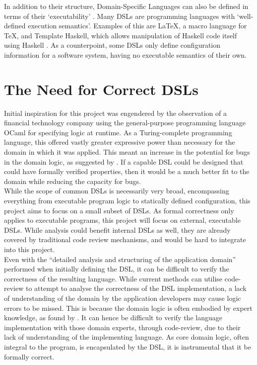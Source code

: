In addition to their structure, Domain-Specific Languages can also be defined in terms of their `executability' \citep{Mernik:2005:DDL:1118890.1118892}.
Many DSLs are programming languages with `well-defined execution semantics'.
Examples of this are \LaTeX, a macro language for \TeX, and Template Haskell, which allows manipulation of Haskell code itself using Haskell \citep{Sheard:2002:TMH:581690.581691}.
As a counterpoint, some DSLs only define configuration information for a software system, having no executable semantics of their own.


\section{The Need for Correct DSLs} %
\label{sec:the_need_for_correct_dsls}
Initial inspiration for this project was engendered by the observation of a financial technology company using the general-purpose programming language OCaml for specifying logic at runtime.
As a Turing-complete programming language, this offered vastly greater expressive power than necessary for the domain in which it was applied.
This meant an increase in the potential for bugs in the domain logic, as suggested by \cite{subramanyam2003empirical}.
If a capable DSL could be designed that could have formally verified properties, then it would be a much better fit to the domain while reducing the capacity for bugs.\\

While the scope of common DSLs is necessarily very broad, encompassing everything from executable program logic to statically defined configuration, this project aims to focus on a small subset of DSLs.
As formal correctness only applies to executable programs, this project will focus on external, executable DSLs. 
While analysis could benefit internal DSLs as well, they are already covered by traditional code review mechanisms, and would be hard to integrate into this project.\\

Even with the ``detailed analysis and structuring of the application domain'' \citep{van2000domain} performed when initially defining the DSL, it can be difficult to verify the correctness of the resulting language. 
While current methods can utilise code-review to attempt to analyse the correctness of the DSL implementation, a lack of understanding of the domain by the application developers may cause logic errors to be missed. 
This is because the domain logic is often embodied by expert knowledge, as found by \cite{studer1998knowledge}. 
It can hence be difficult to verify the language implementation with those domain experts, through code-review, due to their lack of understanding of the implementing language.
As core domain logic, often integral to the program, is encapsulated by the DSL, it is instrumental that it be formally correct.\\

